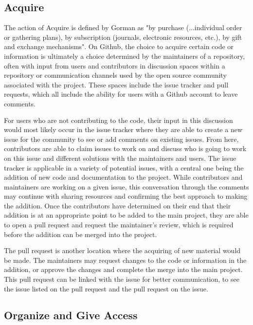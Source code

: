 \subsection{Acquire}

The action of Acquire is defined by Gorman as "by purchase (...individual order or gathering plans), by subscription (journals, electronic resources, etc.), by gift and exchange mechanisms"\cite{gorman2000values}. On Github, the choice to acquire certain code or information is ultimately a choice determined by the maintainers of a repository, often with input from users and contributors in discussion spaces within a repository or communication channels used by the open source community associated with the project. These spaces include the issue tracker and pull requests, which all include the ability for users with a Github account to leave comments. 

For users who are not contributing to the code, their input in this discussion would most likely occur in the issue tracker where they are able to create a new issue for the community to see or add comments on existing issues. From here, contributors are able to claim issues to work on and discuss who is going to work on this issue and different solutions with the maintainers and users. The issue tracker is applicable in a variety of potential issues, with a central one being the addition of new code and documentation to the project. While contributors and maintainers are working on a given issue, this conversation through the comments may continue with sharing resources and confirming the best approach to making the addition. Once the contributors have determined on their end that their addition is at an appropriate point to be added to the main project, they are able to open a pull request and request the maintainer's review, which is required before the addition can be merged into the project. 

The pull request is another location where the acquiring of new material would be made. The maintainers may request changes to the code or information in the addition, or approve the changes and complete the merge into the main project. This pull request can be linked with the issue for better communication, to see the issue listed on the pull request and the pull request on the issue. 

\subsection{Organize and Give Access}

